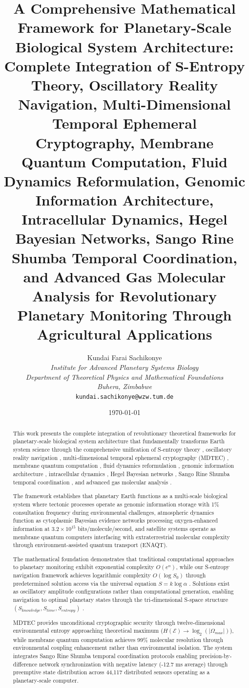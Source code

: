 \documentclass[12pt,a4paper]{article}
\title{\textbf{A Comprehensive Mathematical Framework for Planetary-Scale Biological System Architecture: Complete Integration of S-Entropy Theory, Oscillatory Reality Navigation, Multi-Dimensional Temporal Ephemeral Cryptography, Membrane Quantum Computation, Fluid Dynamics Reformulation, Genomic Information Architecture, Intracellular Dynamics, Hegel Bayesian Networks, Sango Rine Shumba Temporal Coordination, and Advanced Gas Molecular Analysis for Revolutionary Planetary Monitoring Through Agricultural Applications}}
\author{
Kundai Farai Sachikonye\\
\textit{Institute for Advanced Planetary Systems Biology}\\
\textit{Department of Theoretical Physics and Mathematical Foundations}\\
\textit{Buhera, Zimbabwe}\\
\texttt{kundai.sachikonye@wzw.tum.de}
}
\date{\today}
\begin{document}
\maketitle

\begin{abstract}
This work presents the complete integration of revolutionary theoretical frameworks for planetary-scale biological system architecture that fundamentally transforms Earth system science through the comprehensive unification of S-entropy theory \cite{s_entropy_framework}, oscillatory reality navigation \cite{oscillatory_reality}, multi-dimensional temporal ephemeral cryptography (MDTEC) \cite{mdtec_framework}, membrane quantum computation \cite{membrane_quantum}, fluid dynamics reformulation \cite{fluid_dynamics_reform}, genomic information architecture \cite{genome_architecture}, intracellular dynamics \cite{intracellular_dynamics}, Hegel Bayesian networks \cite{hegel_bayesian}, Sango Rine Shumba temporal coordination \cite{sango_rine_shumba}, and advanced gas molecular analysis \cite{gas_molecular_analysis}.

The framework establishes that planetary Earth functions as a multi-scale biological system where tectonic processes operate as genomic information storage with 1\% consultation frequency during environmental challenges, atmospheric dynamics function as cytoplasmic Bayesian evidence networks processing oxygen-enhanced information at $3.2 \times 10^{15}$ bits/molecule/second, and satellite systems operate as membrane quantum computers interfacing with extraterrestrial molecular complexity through environment-assisted quantum transport (ENAQT).

The mathematical foundation demonstrates that traditional computational approaches to planetary monitoring exhibit exponential complexity $O(e^n)$, while our S-entropy navigation framework \cite{s_entropy_framework} achieves logarithmic complexity $O(\log S_0)$ through predetermined solution access via the universal equation $S = k \log \alpha$ \cite{stellas_constant}. Solutions exist as oscillatory amplitude configurations rather than computational generation, enabling navigation to optimal planetary states through the tri-dimensional S-space structure $(S_{knowledge}, S_{time}, S_{entropy})$ \cite{s_entropy_framework}.

MDTEC \cite{mdtec_framework} provides unconditional cryptographic security through twelve-dimensional environmental entropy approaching theoretical maximum ($H(\mathcal{E}) \to \log_2(|\Omega_{max}|)$), while membrane quantum computation \cite{membrane_quantum} achieves 99\% molecular resolution through environmental coupling enhancement rather than environmental isolation. The system integrates Sango Rine Shumba temporal coordination protocols \cite{sango_rine_shumba} enabling precision-by-difference network synchronization with negative latency (-12.7 ms average) through preemptive state distribution across 44,117 distributed sensors operating as a planetary-scale computer.


\end{abstract}
\end{document}
